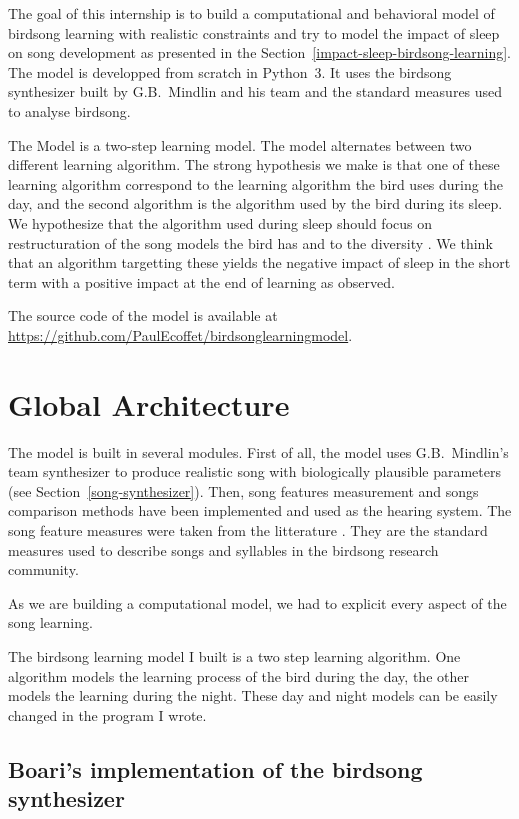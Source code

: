 \documentclass{report}
\begin{document}
The goal of this internship is to build a computational and behavioral model of
birdsong learning with realistic constraints and try to model the impact of
sleep on song development as presented in the
Section~\ref{impact-sleep-birdsong-learning}. The model is developped from
scratch in Python~3. It uses the birdsong synthesizer built by G.B.~Mindlin and
his team and the standard measures used to analyse birdsong.

The Model is a two-step learning model. The model alternates between two
different learning algorithm. The strong hypothesis we make is that one of these
learning algorithm correspond to the learning algorithm the bird uses during the
day, and  the second algorithm is the algorithm used by the bird during its
sleep. We hypothesize that the algorithm used during sleep should focus on
restructuration of the song models the bird has and to the diversity \todo{}. We
think that an algorithm targetting these \todo{} yields the negative impact of
sleep in the short term with a positive impact at the end of learning as
\textcite{deregnaucourt_how_2005} observed.

The source code of the model is available at
\url{https://github.com/PaulEcoffet/birdsonglearningmodel}.

\section{Global Architecture} \label{global-architecture}

The model is built in several modules. First of all, the model uses
G.B.~Mindlin's team synthesizer to produce realistic song with biologically
plausible parameters (see Section~\ref{song-synthesizer}). Then, song features
measurement and songs comparison methods have been implemented and used as the
hearing system. The song feature measures were taken from the litterature
\parencite{tchernichovski_procedure_2000}. They are the standard measures used
to describe songs and syllables in the birdsong research community.

As we are building a computational model, we had to explicit every aspect of the
song learning.

The birdsong learning model I built is a two step learning algorithm. One
algorithm models the learning process of the bird during the day, the other
models the learning during the night. These day and night models can be easily
changed in the program I wrote.

\subsection{Boari's implementation of the birdsong synthesizer}
\label{usage-of-boaris-implementation-of-the-birdsong-synthesizer}
\end{document}
